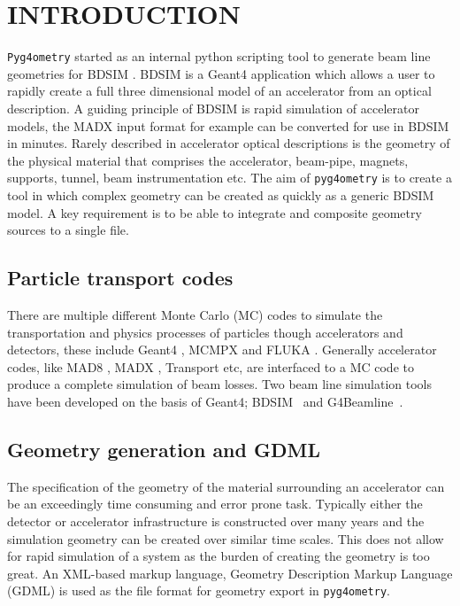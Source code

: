 \documentclass[a4paper,
               keeplastbox,   %
               ]{jacow}
\begin{document}
\section{INTRODUCTION}
\verb|Pyg4ometry| started as an internal python scripting tool to generate beam line geometries for BDSIM \cite{bdsim_arxiv, bdsim_manual, Nevay:IPAC19-WEPTS058}. BDSIM is a Geant4 application which allows a user to rapidly create a full three dimensional model of an accelerator from an optical description. A guiding principle of BDSIM is rapid simulation of accelerator models, the MADX input format for example can be converted for use in BDSIM in minutes. Rarely described in accelerator optical descriptions is the geometry of the physical material that comprises the accelerator, beam-pipe, magnets, supports, tunnel, beam instrumentation etc. The aim of \verb|pyg4ometry| is to create a tool  in which complex geometry can be created as quickly as a generic BDSIM model. A key requirement is to be able to integrate and composite geometry sources to a single file.             
%

\subsection{Particle transport codes}
There are multiple different Monte Carlo (MC) codes to simulate the transportation and physics processes of particles though accelerators and detectors, these include Geant4 \cite{geant4}, MCMPX and FLUKA \cite{fluka}. Generally accelerator codes, like MAD8 \cite{mad8}, MADX \cite{madx}, Transport \cite{transport} etc, are interfaced to a MC code to produce a complete simulation of beam losses. Two beam line simulation tools have been developed on the basis of Geant4; BDSIM~\cite{bdsim_arxiv} and G4Beamline~\cite{g4beamline}.     

\subsection{Geometry generation and GDML}
The specification of the geometry of the material surrounding an accelerator can be an exceedingly time consuming and error prone task. Typically either the detector or accelerator infrastructure is constructed over many years and the simulation geometry can be created over similar time scales. This does not allow for rapid simulation of a system as the burden of creating the geometry is too great. An XML-based markup language, Geometry Description Markup Language (GDML) is used as the file format for geometry export in \verb|pyg4ometry|.
\end{document}
